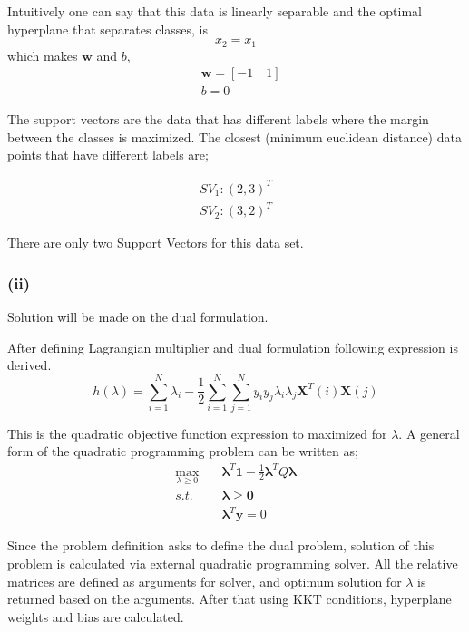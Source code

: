 \documentclass[11pt]{article}
\begin{document}
Intuitively one can say that this data is linearly separable and the optimal hyperplane that separates classes, is 
\begin{equation*}
    x_2 = x_1
\end{equation*}
which makes $\bm{w}$ and $b$,
\begin{align*}
    &\bm{w} = [-1 \quad 1] \\
    &b = 0
\end{align*}

The support vectors are the data that has different labels where the margin between the classes is maximized. The closest (minimum euclidean distance) data points that have different labels are;

\begin{align*}
    SV_1 : (2,3)^T \\
    SV_2 : (3,2)^T
\end{align*}

There are only two Support Vectors for this data set.

\subsubsection*{(ii)}

Solution will be made on the dual formulation. \medskip

After defining Lagrangian multiplier and dual formulation following expression is derived.
\begin{equation*}
    h(\lambda) = \sum_{i=1}^N \lambda_i - \frac{1}{2} \sum_{i=1}^N \sum_{j=1}^N y_i y_j \lambda_i \lambda_j \bm{X}^T(i) \bm{X}(j)
\end{equation*}

This is the quadratic objective function expression to maximized for $\lambda$. A general form of the quadratic programming problem can be written as;
\begin{align*}
    \max_{\lambda \geq 0} \quad  &\bm{\lambda}^T \bm{1}- \frac{1}{2} \bm{\lambda}^T Q \bm{\lambda} \\ 
    s.t.     \quad               &\bm{\lambda} \geq \bm{0} \\
                                &\bm{\lambda}^T\bm{y} = 0
\end{align*}

Since the problem definition asks to define the dual problem, solution of this problem is calculated via external quadratic programming solver. All the relative matrices are defined as arguments for solver, and optimum solution for $\lambda$ is returned based on the arguments. After that using KKT conditions, hyperplane weights and bias are calculated.
\end{document}
